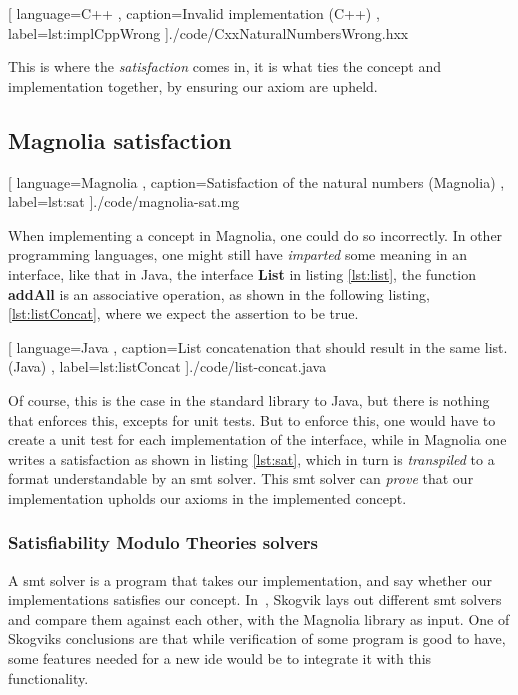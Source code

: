 \begin{code}[H]
  
    [ language=C++
    , caption={Invalid implementation (C++)}
    , label=lst:implCppWrong
    ]{./code/CxxNaturalNumbersWrong.hxx}
\end{code}

This is where the
\textit{satisfaction} comes in, it is what ties the concept and implementation
together, by ensuring our axiom are upheld.

\subsection{Magnolia satisfaction}

\begin{center}
  
    [ language=Magnolia
    , caption={Satisfaction of the natural numbers (Magnolia)}
    , label=lst:sat
    ]{./code/magnolia-sat.mg}
\end{center}

When implementing a concept in Magnolia, one could do so incorrectly. In other
programming languages, one might still have \textit{imparted} some meaning in an
interface, like that in Java, the interface \textbf{List} in listing \ref{lst:list}, the
function \textbf{addAll} is an associative operation, as shown in the following
listing, \ref{lst:listConcat}, where we expect the assertion to be true.

\begin{code}
  
    [ language=Java
    , caption={List concatenation that should result in the same list. (Java)}
    , label=lst:listConcat
    ]{./code/list-concat.java}
\end{code}

Of course, this is the case in the standard library to Java, but there is
nothing that enforces this, excepts for unit tests. But to enforce this, one
would have to create a unit test for each implementation of the interface, while
in Magnolia one writes a satisfaction as shown in listing \ref{lst:sat}, which
in turn is \textit{transpiled} to a format understandable by an \gls*{smt}
solver. This \gls*{smt} solver can \textit{prove} that our implementation
upholds our axioms in the implemented concept.

\subsubsection{Satisfiability Modulo Theories solvers}

A \gls*{smt} solver is a program that takes our implementation, and say whether
our implementations satisfies our concept. In~\cite{beateVerification}, Skogvik
lays out different \gls*{smt} solvers and compare them against each other, with
the Magnolia library as input. One of Skogviks conclusions are that while
verification of some program is good to have, some features needed for a new
\gls*{ide} would be to integrate it with this functionality.


